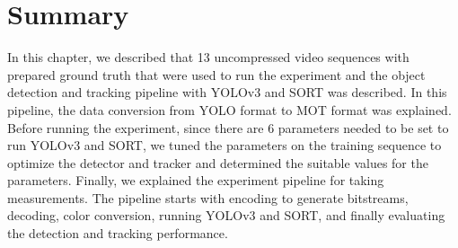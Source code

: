 \section{Summary}
\label{sec:methods/summary}

In this chapter, we described that 13 uncompressed video sequences with prepared ground truth that were used to run the experiment and the object detection and tracking pipeline with YOLOv3 and SORT was described. In this pipeline, the data conversion from YOLO format to MOT format was explained. Before running the experiment, since there are 6 parameters needed to be set to run YOLOv3 and SORT, we tuned the parameters on the training sequence to optimize the detector and tracker and determined the suitable values for the parameters. Finally, we explained the experiment pipeline for taking measurements. The pipeline starts with encoding to generate bitstreams, decoding, color conversion, running YOLOv3 and SORT, and finally evaluating the detection and tracking performance.